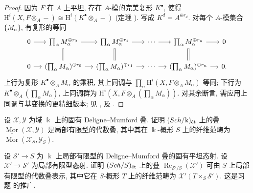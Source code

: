 \begin{proof}
因为 $F$ 在 $A$ 上平坦, 存在 $A$-模的完美复形 $K^\bullet$, 使得 $\mathrm H^i(X,F\otimes_A-)\cong\mathrm H^i(K^\bullet\otimes_A-)$ (定理 ). 写成 $K^d=A^{\oplus r_d}$. 对每个 $A$-模集合 $\{M_\alpha\}$, 有复形的等同
\[
\begin{tikzcd}[column sep=small]
0\arrow[r]&\prod_\alpha M_\alpha^{\oplus r_0}\arrow[r]\arrow[d,equal]&\prod_\alpha M_\alpha^{\oplus r_1}\arrow[r]\arrow[d,equal]&\cdots\arrow[r]&\prod_\alpha M_\alpha^{\oplus r_n}\arrow[r]\arrow[d,equal]&0\\
0\arrow[r]&(\prod_\alpha M_\alpha)^{\oplus r_0}\arrow[r]&(\prod_\alpha M_\alpha)^{\oplus r_1}\arrow[r]&\cdots\arrow[r]&(\prod_\alpha M_\alpha)^{\oplus r_n}\arrow[r]&0.
\end{tikzcd}
\]
上行为复形 $K^\bullet\otimes_AM_\alpha$ 的乘积, 其上同调与 $\prod_\alpha\mathrm H^i(X,F\otimes_AM_\alpha)$ 等同; 下行为 $K^\bullet\otimes_A(\prod_\alpha M_\alpha)$, 上同调群为 $\mathrm H^i(X,F\otimes_A(\prod_\alpha M_\alpha))$. 对其余断言, 需应用上同调与基变换的更精细版本; 见 \cite[III.7.7.5]{EGA}, \cite[Tag 08JR]{SP} 及 \cite[定理 E]{Hal14b}.
\end{proof}
\begin{exercise}[Hom 叠, 难]\label{src:C.7.9}
设 $\mathcal X,\mathcal Y$ 为域 $\Bbbk$ 上的固有 Deligne--Mumford 叠. 证明 $(Sch/\Bbbk)_{\text{ét}}$ 上的叠 $\underline{\operatorname{Mor}}(\mathcal X,\mathcal Y)$ 是局部有限型的代数叠, 其中其在 $\Bbbk$-概形 $S$ 上的纤维范畴为 $\operatorname{Mor}(\mathcal X_S,\mathcal Y_S)$.
\end{exercise}
\begin{exercise}[Weil 限制, 难]\label{src:C.7.10}
设 $\mathcal S'\to S$ 为 $\Bbbk$ 上局部有限型的 Deligne--Mumford 叠的固有平坦态射. 设 $\mathcal X'\to\mathcal S'$ 为局部有限型态射. 证明 $(Sch/S)_{\text{ét}}$ 上的叠 $\operatorname{Re}_{\mathcal S'/S}(\mathcal X')$ 可由 $S$ 上局部有限型的代数叠表示, 其中它在 $S$-概形 $T$ 上的纤维范畴为 $\mathcal X'(T\times_S\mathcal S')$. 这是习题  的推广.
\end{exercise}
